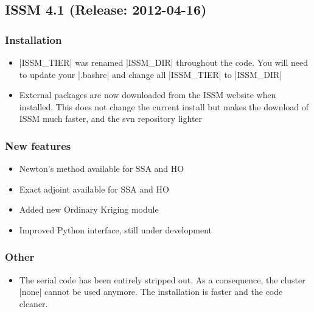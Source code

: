 \subsection*{ISSM 4.1 (Release: 2012-04-16)}
\subsubsection{Installation}
\begin{itemize}
\item \lstinlinebg|ISSM_TIER| was renamed \lstinlinebg|ISSM_DIR| throughout the code. You will need to update your \lstinlinebg|.bashrc| and change all \lstinlinebg|ISSM_TIER| to \lstinlinebg|ISSM_DIR|
\item External packages are now downloaded from the ISSM website when installed. This does not change the current install but makes the download of ISSM much faster, and the svn repository lighter
\end{itemize}
\subsubsection{New features}
\begin{itemize}
\item Newton's method available for SSA and HO
\item Exact adjoint available for SSA and HO
\item Added new Ordinary Kriging module
\item Improved Python interface, still under development
\end{itemize}
\subsubsection{Other}
\begin{itemize}
\item The serial code has been entirely stripped out. As a consequence, the cluster \lstinlinebg|none| cannot be used anymore. The installation is faster and the code cleaner.
\end{itemize}

\clearpage %
